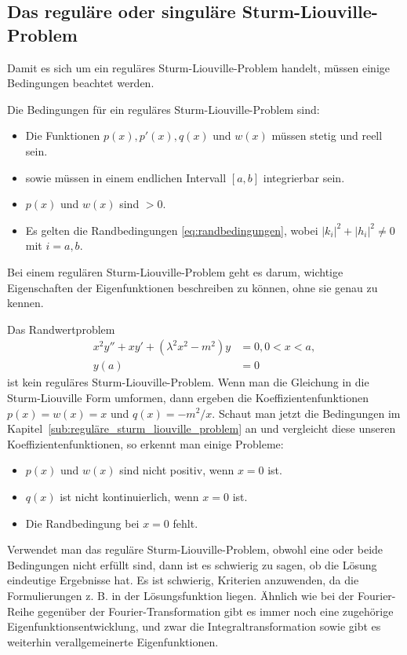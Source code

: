 \subsection{Das reguläre oder singuläre Sturm-Liouville-Problem
\label{sub:reguläre_sturm_liouville_problem}}
Damit es sich um ein reguläres Sturm-Liouville-Problem handelt, müssen einige
Bedingungen beachtet werden.
\begin{definition}
	\label{def:reguläres_sturm-liouville-problem}
	Die Bedingungen für ein reguläres Sturm-Liouville-Problem sind:
	\begin{itemize}
		\item Die Funktionen $p(x), p'(x), q(x)$ und $w(x)$ müssen stetig und
		reell sein.
		\item sowie müssen in einem endlichen Intervall $[a,b]$ integrierbar
		sein.
		\item $p(x)$ und $w(x)$ sind $>0$.
		\item Es gelten die Randbedingungen \eqref{eq:randbedingungen}, wobei
		$|k_i|^2 + |h_i|^2\ne 0$ mit $i=a,b$.
	\end{itemize}
\end{definition}
Bei einem regulären Sturm-Liouville-Problem geht es darum, wichtige
Eigenschaften der Eigenfunktionen beschreiben zu können, ohne sie genau zu
kennen.

\begin{beispiel}
	Das Randwertproblem
	\begin{equation}
		\begin{aligned}
		x^2y'' + xy' + (\lambda^2x^2 - m^2)y &= 0, 0<x<a,\\
		y(a) &= 0
		\end{aligned}
	\end{equation}
	ist kein reguläres Sturm-Liouville-Problem.
	Wenn man die Gleichung in die Sturm-Liouville Form umformen, dann ergeben
	die Koeffizientenfunktionen $p(x) = w(x) = x$ und $q(x) = -m^2/x$.
	Schaut man jetzt die Bedingungen im
	Kapitel~\ref{sub:reguläre_sturm_liouville_problem} an und vergleicht diese
	unseren Koeffizientenfunktionen, so erkennt man einige Probleme:
	\begin{itemize}
		\item $p(x)$ und $w(x)$ sind nicht positiv, wenn $x = 0$ ist.
		\item $q(x)$ ist nicht kontinuierlich, wenn $x = 0$ ist.
		\item Die Randbedingung bei $x = 0$ fehlt.
	\end{itemize}
\end{beispiel}

Verwendet man das reguläre Sturm-Liouville-Problem, obwohl eine oder beide
Bedingungen nicht erfüllt sind, dann ist es schwierig zu sagen, ob die Lösung
eindeutige Ergebnisse hat.
Es ist schwierig, Kriterien anzuwenden, da die Formulierungen z. B. in der
Lösungsfunktion liegen.
Ähnlich wie bei der Fourier-Reihe gegenüber der Fourier-Transformation gibt es
immer noch eine zugehörige Eigenfunktionsentwicklung, und zwar die
Integraltransformation sowie gibt es weiterhin verallgemeinerte Eigenfunktionen.
